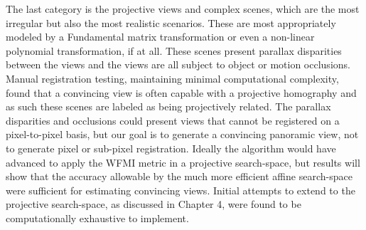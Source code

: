 The last category is the projective views and complex scenes, which are the most irregular but also the most realistic scenarios. These are most appropriately modeled by a Fundamental matrix transformation or even a non-linear polynomial transformation, if at all. These scenes present parallax disparities between the views and the views are all subject to object or motion occlusions. Manual registration testing, maintaining minimal computational complexity, found that a convincing view is often capable with a projective homography and as such these scenes are labeled as being projectively related. The parallax disparities and occlusions could present views that cannot be registered on a pixel-to-pixel basis, but our goal is to generate a convincing panoramic view, not to generate pixel or sub-pixel registration. Ideally the algorithm would have advanced to apply the WFMI metric in a projective search-space, but results will show that the accuracy allowable by the much more efficient affine search-space were sufficient for estimating convincing views. Initial attempts to extend to the projective search-space, as discussed in Chapter 4, were found to be computationally exhaustive to implement.

